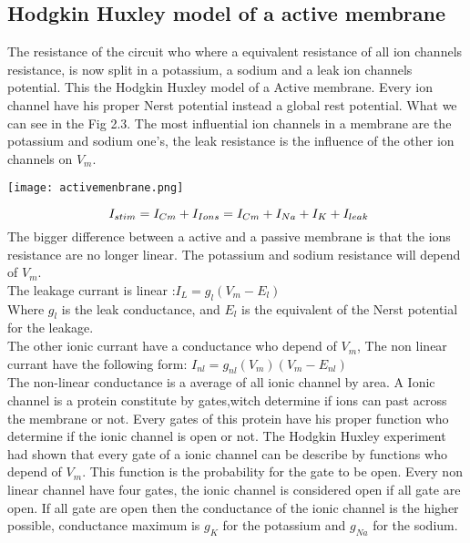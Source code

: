 \documentclass[a4paper,10pt]{report}
\begin{document}
\subsection{Hodgkin Huxley model of a active membrane}
The resistance of the circuit who where a equivalent resistance of all ion channels resistance, is now split in a potassium, a sodium and a leak ion channels potential. This the Hodgkin Huxley model of a Active membrane.
Every ion channel have his proper Nerst potential instead a global rest potential. What we can see in the Fig 2.3. The most influential ion channels in a membrane are the potassium and sodium one's, the leak resistance is the influence of the other ion channels on $V_{m}$.
\begin{center}
\texttt{[image: activemenbrane.png]} 
\label{fig1}
\end{center}
$$
\ I_{stim} = I_{Cm}+I_{Ions}=I_{Cm}+I_{Na}+I_{K}+I_{leak} \\
$$
The bigger difference between a active and a passive membrane is that the ions resistance are no longer linear. The potassium and sodium resistance will depend of $V_{m}$.\\
The leakage currant is linear :$I_{L}= g_{l}(V_{m}-E_{l})$\\
Where $g_{l}$ is the leak conductance, and $E_{l}$ is the equivalent of the Nerst potential for the leakage.\\
The other ionic currant have a conductance who depend of $V_{m}$, The non linear currant have the following form: $I_{nl}=g_{nl}(V_{m})(V_{m}-E_{nl})$\\
The non-linear conductance is a average of all ionic channel by area. A Ionic channel is a protein constitute by gates,witch determine if ions can past across the membrane or not. Every gates of this protein have his proper function who determine if the ionic channel is open or not. The Hodgkin Huxley experiment had shown that every gate of a ionic channel can be describe by functions who depend of $V_{m}$. This function is the probability for the gate to be open. Every non linear channel have four gates, the ionic channel is considered open if all gate are open. If all gate are open then the conductance of the ionic channel is the higher possible, conductance maximum is $g_{K}$ for the potassium and  $g_{Na}$ for the sodium. 
\end{document}

